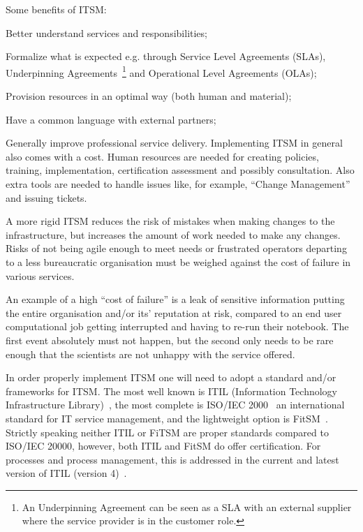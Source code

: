 \documentclass[12pt,a4paper]{article}
\begin{document}
Some benefits of ITSM:
\bitm
\item Better understand services and responsibilities;
\item Formalize what is expected e.g. through Service Level Agreements (SLAs), Underpinning Agreements~\footnote{An Underpinning Agreement can be seen as a SLA with an external supplier where the service provider is in the customer role.}
and Operational Level Agreements (OLAs);
\item Provision resources in an optimal way (both human and material);
\item Have a common language with external partners;
\item Generally improve professional service delivery.
\eitm
Implementing ITSM in general also comes with a cost.  
Human resources are needed for creating policies, training,
implementation, certification assessment and possibly consultation. 
Also extra tools are needed to handle issues
like, for example, ``Change Management'' and issuing tickets.

A more rigid ITSM reduces the risk of mistakes when making changes to the infrastructure, but increases the amount of work needed to make any changes. 
Risks of not being agile enough to meet needs or frustrated operators departing to a less bureaucratic organisation must be weighed against the cost of failure in various services.

An example of a high ``cost of failure'' is a leak of sensitive information putting the entire organisation and/or its' reputation at risk, compared to an end user computational job getting interrupted and having to re-run their notebook. 
The first event absolutely must not happen, but the second only needs to be rare enough that the scientists are not unhappy with
the service offered.

In order properly implement ITSM one will need to adopt a standard and/or frameworks for ITSM. 
The most well known is ITIL (Information Technology Infrastructure Library)~\cite{itil},%
the most complete is ISO/IEC 2000~\cite{iso2000} an international standard for IT service management, %
and the lightweight option is FitSM~\cite{fitsm}.
Strictly speaking neither ITIL or FiTSM are proper standards compared to ISO/IEC 20000, however, both ITIL and FitSM do offer certification.
For processes and process management, this is addressed in the 
current and latest version of ITIL (version 4)~\cite{itil4}.
\end{document}
